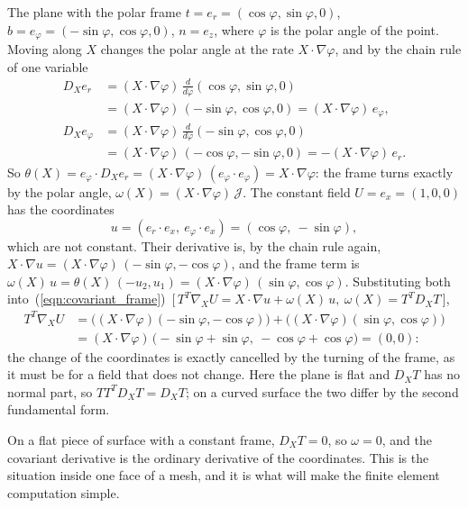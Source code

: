 \begin{example}
\label{ex:polar_frame}
The plane with the polar frame $t = e_r = (\cos\varphi, \sin\varphi, 0)$, $b = e_\varphi = (-\sin\varphi, \cos\varphi, 0)$, $n = e_z$, where $\varphi$ is the polar angle of the point. Moving along $X$ changes the polar angle at the rate $X\cdot\nabla\varphi$, and by the chain rule of one variable
\begin{align*}
D_X e_r &= (X\cdot\nabla\varphi)\, \frac{d}{d\varphi}(\cos\varphi, \sin\varphi, 0) \\
&= (X\cdot\nabla\varphi)\, (-\sin\varphi, \cos\varphi, 0) = (X\cdot\nabla\varphi)\, e_\varphi , \\
D_X e_\varphi &= (X\cdot\nabla\varphi)\, \frac{d}{d\varphi}(-\sin\varphi, \cos\varphi, 0) \\
&= (X\cdot\nabla\varphi)\, (-\cos\varphi, -\sin\varphi, 0) = -(X\cdot\nabla\varphi)\, e_r .
\end{align*}
So $\theta(X) = e_\varphi \cdot D_X e_r = (X\cdot\nabla\varphi)\, (e_\varphi\cdot e_\varphi) = X \cdot \nabla\varphi$: the frame turns exactly by the polar angle, $\omega(X) = (X\cdot\nabla\varphi)\,\mathcal J$. The constant field $U = e_x = (1, 0, 0)$ has the coordinates
\begin{equation*}
u = (e_r\cdot e_x,\ e_\varphi\cdot e_x) = (\cos\varphi,\ -\sin\varphi),
\end{equation*}
which are not constant. Their derivative is, by the chain rule again, $X\cdot\nabla u = (X\cdot\nabla\varphi)\,(-\sin\varphi, -\cos\varphi)$, and the frame term is $\omega(X)\,u = \theta(X)\,(-u_2, u_1) = (X\cdot\nabla\varphi)\,(\sin\varphi, \cos\varphi)$. Substituting both into~(\ref{eqn:covariant_frame})~[\,$T^T\nabla_X U = X\cdot\nabla u + \omega(X)\,u,\ \omega(X) = T^TD_XT$\,],
\begin{align*}
T^T\nabla_X U &= \big((X\cdot\nabla\varphi)(-\sin\varphi, -\cos\varphi)\big) + \big((X\cdot\nabla\varphi)(\sin\varphi, \cos\varphi)\big) \\
&= (X\cdot\nabla\varphi)\,\big(-\sin\varphi + \sin\varphi,\ -\cos\varphi + \cos\varphi\big) = (0, 0) :
\end{align*}
the change of the coordinates is exactly cancelled by the turning of the frame, as it must be for a field that does not change. Here the plane is flat and $D_X T$ has no normal part, so $T T^T D_X T = D_X T$; on a curved surface the two differ by the second fundamental form.
\end{example}
On a flat piece of surface with a constant frame, $D_X T = 0$, so $\omega = 0$, and the covariant derivative is the ordinary derivative of the coordinates. This is the situation inside one face of a mesh, and it is what will make the finite element computation simple.

